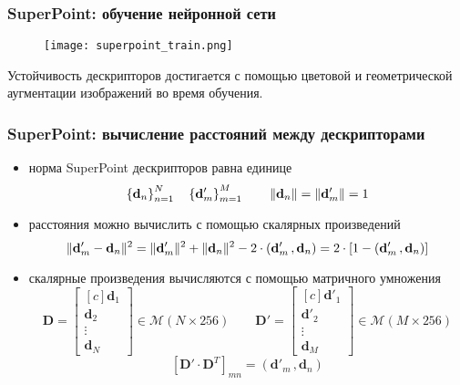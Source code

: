\documentclass[12pt, usepdftitle=false, aspectratio=1610]{beamer}
\DeclarePairedDelimiter{\norm}{\lVert}{\rVert}
\begin{document}
\begin{frame}[fragile]
\frametitle{SuperPoint: обучение нейронной сети}
\begin{figure}
    \texttt{[image: superpoint\_train.png]}
\end{figure}
Устойчивость дескрипторов достигается с помощью цветовой и геометрической
аугментации изображений во время обучения.
\end{frame}

\begin{frame}[fragile]
\frametitle{SuperPoint: вычисление расстояний между дескрипторами}
\begin{itemize}
    \item норма SuperPoint дескрипторов равна единице
    $$
        \left\{\mathbf{d}_n\right\}_{n=1}^N
        \quad
        \left\{\mathbf{d}'_m\right\}_{m=1}^M
        \qquad
        \norm{\mathbf{d}_n}=\norm{\mathbf{d}'_m}=1
    $$
    \item расстояния можно вычислить с помощью скалярных произведений
    $$
        \norm{\mathbf{d}'_m-\mathbf{d}_n}^2=
        \norm{\mathbf{d}'_m}^2+\norm{\mathbf{d}_n}^2-2\cdot(\mathbf{d}'_m\,,\mathbf{d}_n)=
        2\cdot[1-(\mathbf{d}'_m\,,\mathbf{d}_n)]
    $$
    \item скалярные произведения вычисляются с помощью матричного умножения
    $$
        \boldsymbol{D}=
        \begin{bmatrix*}[c]
            \mathbf{d}_1 \\ \mathbf{d}_2 \\ \vdots \\ \mathbf{d}_N 
        \end{bmatrix*}
        \in\mathcal{M}(N\times256)
        \qquad
        \boldsymbol{D}'=
        \begin{bmatrix*}[c]
            \mathbf{d}'_1 \\ \mathbf{d}'_2 \\ \vdots \\ \mathbf{d}_M 
        \end{bmatrix*}
        \in\mathcal{M}(M\times256)
    $$
    $$
        \left[\boldsymbol{D}'\cdot \boldsymbol{D}^T\right]_{mn}=
        (\mathbf{d}'_m\,,\mathbf{d}_n)
    $$
\end{itemize}
\end{frame}
\end{document}
